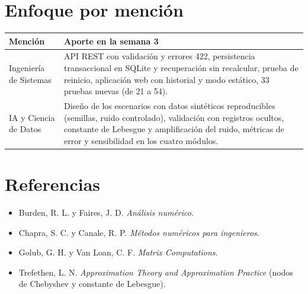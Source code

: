 \documentclass[11pt,letterpaper]{article}
\begin{document}
\section{Enfoque por mención}
{\small
\begin{longtable}{p{2.6cm}p{12.6cm}}
\toprule
\textbf{Mención} & \textbf{Aporte en la semana 3}\\
\midrule
Ingeniería de Sistemas & API REST con validación y errores 422, persistencia transaccional en SQLite y recuperación sin recalcular, prueba de reinicio, aplicación web con historial y modo estático, 33 pruebas nuevas (de 21 a 54).\\
IA y Ciencia de Datos & Diseño de los escenarios con datos sintéticos reproducibles (semillas, ruido controlado), validación con registros ocultos, constante de Lebesgue y amplificación del ruido, métricas de error y sensibilidad en los cuatro módulos.\\
\bottomrule
\end{longtable}}

\section*{Referencias}
\begin{itemize}
\item Burden, R. L. y Faires, J. D. \emph{Análisis numérico}.
\item Chapra, S. C. y Canale, R. P. \emph{Métodos numéricos para ingenieros}.
\item Golub, G. H. y Van Loan, C. F. \emph{Matrix Computations}.
\item Trefethen, L. N. \emph{Approximation Theory and Approximation Practice} (nodos de Chebyshev y constante de Lebesgue).
\end{itemize}
\end{document}
